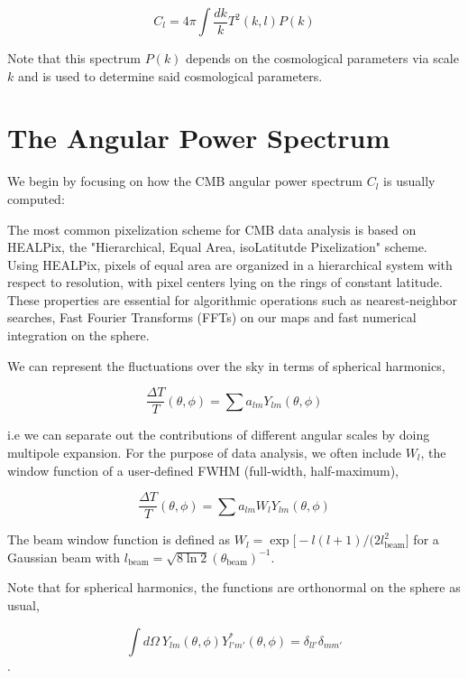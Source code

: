 \documentclass[12pt]{article}
\begin{document}
\begin{equation}
C_l=4\pi\int\frac{dk}{k}T^2(k,l)P(k)
\end{equation}

Note that this spectrum $P(k)$ depends on the cosmological parameters via scale $k$ and is used to determine said cosmological parameters. 



\section{The Angular Power Spectrum}

We begin by focusing on how the CMB angular power spectrum $C_l$ is usually computed:

The most common pixelization scheme for CMB data analysis is based on HEALPix, the "Hierarchical, Equal Area, isoLatitutde Pixelization" scheme. Using HEALPix, pixels of equal area are organized in a hierarchical system with respect to resolution, with pixel centers lying on the rings of constant latitude. These properties are essential for algorithmic operations such as nearest-neighbor searches, Fast Fourier Transforms (FFTs) on our maps and fast numerical integration on the sphere.

We can represent the fluctuations over the sky in terms of spherical harmonics,

\begin{equation}
\frac{\Delta T}{T}(\theta, \phi) = \sum a_{lm}Y_{lm}(\theta, \phi)
\end{equation}

 i.e we can separate out the contributions of different angular scales by doing multipole expansion. For the purpose of data analysis, we often include $W_l$, the window function of a user-defined FWHM (full-width, half-maximum), 

\begin{equation}
\frac{\Delta T}{T}(\theta, \phi) = \sum a_{lm}W_lY_{lm}(\theta, \phi)
\end{equation}


The beam window function is defined as $W_l=\exp\big[-l(l+1)/(2l^2_{\mbox{beam}}\big]$ for a Gaussian beam with $l_{\mbox{beam}}=\sqrt{8\ln2}(\theta_{\mbox{beam}})^{-1}$.

Note that for spherical harmonics, the functions are orthonormal on the sphere as usual,

\begin{equation}
\int d\Omega\  Y_{lm}(\theta, \phi)Y^{*}_{l'm'}(\theta, \phi)=\delta_{ll'}\delta_{mm'}
\end{equation}.
\end{document}

